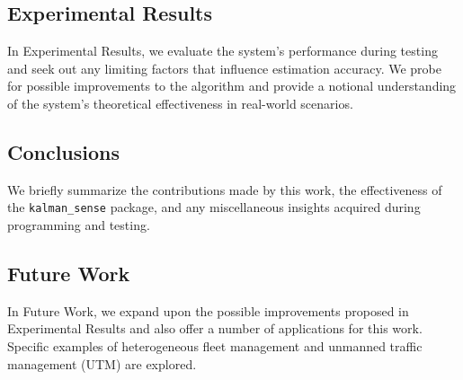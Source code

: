 \subsection*{Experimental Results}

In Experimental Results, we evaluate the system's performance during testing and seek out any limiting factors that influence estimation accuracy. We probe for possible improvements to the algorithm and provide a notional understanding of the system's theoretical effectiveness in real-world scenarios.

\subsection*{Conclusions}

We briefly summarize the contributions made by this work, the effectiveness of the \texttt{kalman\_sense} package, and any miscellaneous insights acquired during programming and testing. 

\subsection*{Future Work}

In Future Work, we expand upon the possible improvements proposed in Experimental Results and also offer a number of applications for this work. Specific examples of heterogeneous fleet management and unmanned traffic management (UTM) are explored.